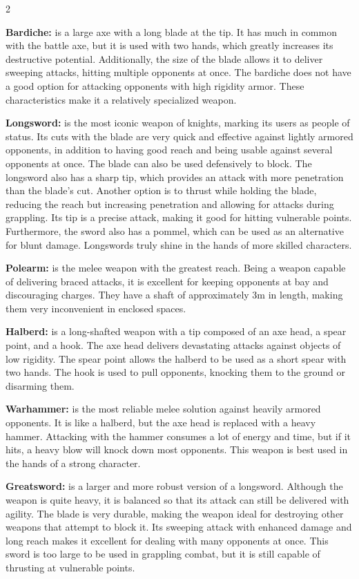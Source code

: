\begin{multicols}{2}

\textbf{Bardiche:} is a large axe with a long blade at the tip. It has much in common with the battle axe, but it is used with two hands, which greatly increases its destructive potential. Additionally, the size of the blade allows it to deliver sweeping attacks, hitting multiple opponents at once. The bardiche does not have a good option for attacking opponents with high rigidity armor. These characteristics make it a relatively specialized weapon. 

\textbf{Longsword:} is the most iconic weapon of knights, marking its users as people of status. Its cuts with the blade are very quick and effective against lightly armored opponents, in addition to having good reach and being usable against several opponents at once. The blade can also be used defensively to block. The longsword also has a sharp tip, which provides an attack with more penetration than the blade's cut. Another option is to thrust while holding the blade, reducing the reach but increasing penetration and allowing for attacks during grappling. Its tip is a precise attack, making it good for hitting vulnerable points. Furthermore, the sword also has a pommel, which can be used as an alternative for blunt damage. Longswords truly shine in the hands of more skilled characters.

\textbf{Polearm:} is the melee weapon with the greatest reach. Being a weapon capable of delivering braced attacks, it is excellent for keeping opponents at bay and discouraging charges. They have a shaft of approximately 3m in length, making them very inconvenient in enclosed spaces.

\textbf{Halberd:} is a long-shafted weapon with a tip composed of an axe head, a spear point, and a hook. The axe head delivers devastating attacks against objects of low rigidity. The spear point allows the halberd to be used as a short spear with two hands. The hook is used to pull opponents, knocking them to the ground or disarming them. 

\textbf{Warhammer:} is the most reliable melee solution against heavily armored opponents. It is like a halberd, but the axe head is replaced with a heavy hammer. Attacking with the hammer consumes a lot of energy and time, but if it hits, a heavy blow will knock down most opponents. This weapon is best used in the hands of a strong character.

\textbf{Greatsword:} is a larger and more robust version of a longsword. Although the weapon is quite heavy, it is balanced so that its attack can still be delivered with agility. The blade is very durable, making the weapon ideal for destroying other weapons that attempt to block it. Its sweeping attack with enhanced damage and long reach makes it excellent for dealing with many opponents at once. This sword is too large to be used in grappling combat, but it is still capable of thrusting at vulnerable points.

\end{multicols}

